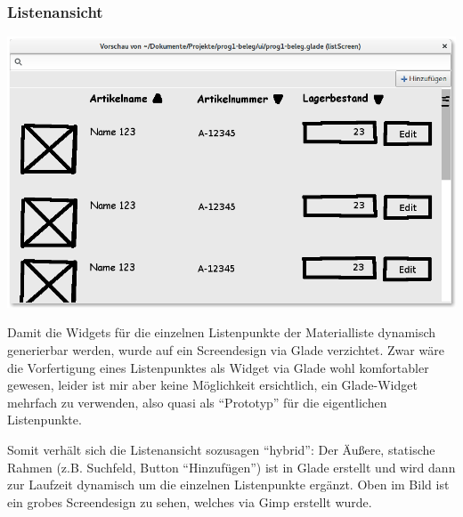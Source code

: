 \subsubsection{Listenansicht}
\begin{center}
\noindent\includegraphics[width=150mm,keepaspectratio]{images/06-listenansicht.png}
\end{center}

Damit die Widgets für die einzelnen Listenpunkte der Materialliste dynamisch generierbar werden, wurde auf ein
Screendesign via Glade verzichtet. Zwar wäre die Vorfertigung eines Listenpunktes als Widget via Glade wohl komfortabler
gewesen, leider ist mir aber keine Möglichkeit ersichtlich, ein Glade-Widget mehrfach zu verwenden, also quasi als
``Prototyp'' für die eigentlichen Listenpunkte.

Somit verhält sich die Listenansicht sozusagen ``hybrid'': Der Äußere, statische Rahmen (z.B. Suchfeld, Button ``Hinzufügen'')
ist in Glade erstellt und wird dann zur Laufzeit dynamisch um die einzelnen Listenpunkte ergänzt.
Oben im Bild ist ein grobes Screendesign zu sehen, welches via Gimp erstellt wurde.
